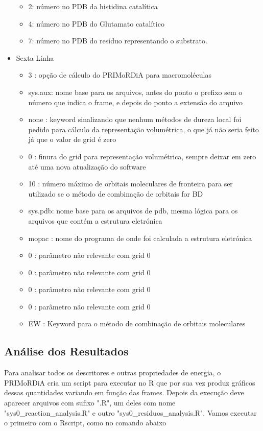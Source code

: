 \documentclass[a4paper,11pt]{refart}
\begin{document}
\begin{itemize}
\begin{itemize}
	\item 2: número no PDB da histidina catalítica
	\item 4: número no PDB do Glutamato catalítico
	\item 7: número no PDB do resíduo representando o substrato.  
	\end{itemize}
	\item Sexta Linha 
	\begin{itemize}
	\item 3      : opção de cálculo do PRIMoRDiA para macromoléculas
	\item sys.aux: nome base para os arquivos, antes do ponto o prefixo sem o número que indica o frame, e depois do ponto a extensão do arquivo
	\item none   : keyword sinalizando que nenhum métodos de dureza local foi pedido para cálculo da representação volumétrica, o que já não seria feito já que o valor de grid é zero
	\item 0      : finura do grid para representação volumétrica, sempre deixar em zero até uma nova atualização do software
	\item 10     : número máximo de orbitais moleculares de fronteira para ser utilizado se o método de combinação de orbitais for BD
	\item sys.pdb: nome base para os arquivos de pdb, mesma lógica para os arquivos que contém a estrutura eletrónica
	\item mopac  : nome do programa de onde foi calculada a estrutura eletrónica
	\item 0      : parâmetro não relevante com grid 0
	\item 0      : parâmetro não relevante com grid 0
	\item 0      : parâmetro não relevante com grid 0
	\item 0      : parâmetro não relevante com grid 0
	\item EW     : Keyword para o método de combinação de orbitais moleculares
	\end{itemize}
\end{itemize}

\subsection{Análise dos Resultados}

Para analisar todos os descritores e outras propriedades de energia, o PRIMoRDiA cria um script para executar no R que por sua vez produz gráficos dessas quantidades variando em função das frames. Depois da execução deve aparecer arquivos com sufixo ".R", um deles com nome "sys0\_reaction\_analysis.R" e outro "sys0\_residuos\_analysis.R". Vamos executar o primeiro com o Rscript, como no comando abaixo
\end{document}
